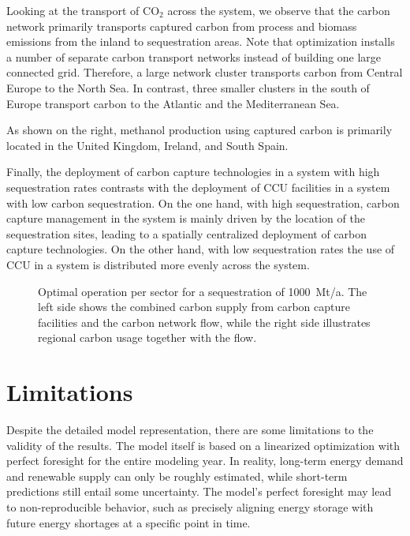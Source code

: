 \documentclass[twocolumn]{article}
\newcommand{\carbon}{CO$_2$}
\begin{document}
Looking at the transport of \carbon{} across the system, we observe that the carbon network primarily transports captured carbon from process and biomass emissions from the inland to sequestration areas. Note that optimization installs a number of separate carbon transport networks instead of building one large connected grid. Therefore, a large network cluster transports carbon from Central Europe to the North Sea. In contrast, three smaller clusters in the south of Europe transport carbon to the Atlantic and the Mediterranean Sea.

As shown on the right, methanol production using captured carbon is primarily located in the United Kingdom, Ireland, and South Spain.

Finally, the deployment of carbon capture technologies in a system with high sequestration rates contrasts with the deployment of CCU facilities in a system with low carbon sequestration. On the one hand, with high sequestration, carbon capture management in the system is mainly driven by the location of the sequestration sites, leading to a spatially centralized deployment of carbon capture technologies. On the other hand, with low sequestration rates the use of CCU in a system is distributed more evenly across the system.


\begin{figure*}[ht!]
    \centering
    \caption{Optimal operation per sector for a sequestration of 1000~Mt/a. The left side shows the combined carbon supply from carbon capture facilities and the carbon network flow, while the right side illustrates regional carbon usage together with the flow.}
    \label{fig:operation_map_noco2network_1000}
\end{figure*}


\section{Limitations}
\label{sec:limitations}

Despite the detailed model representation, there are some limitations to the validity of the results. The model itself is based on a linearized optimization with perfect foresight for the entire modeling year. In reality, long-term energy demand and renewable supply can only be roughly estimated, while short-term predictions still entail some uncertainty. The model's perfect foresight may lead to non-reproducible behavior, such as precisely aligning energy storage with future energy shortages at a specific point in time.
\end{document}
